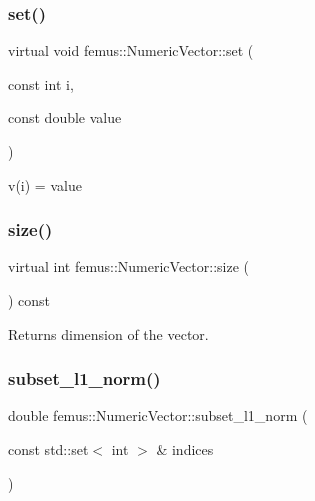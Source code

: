 \subsubsection{\texorpdfstring{set()}{set()}}
{\footnotesize\ttfamily virtual void femus\+::\+Numeric\+Vector\+::set (\begin{DoxyParamCaption}\item[{const int}]{i,  }\item[{const double}]{value }\end{DoxyParamCaption})\hspace{0.3cm}{\ttfamily [pure virtual]}}



v(i) = value 

\mbox{\label{classfemus_1_1_numeric_vector_a54137bb26362db737820d48b5c6169ed}} 
\subsubsection{\texorpdfstring{size()}{size()}}
{\footnotesize\ttfamily virtual int femus\+::\+Numeric\+Vector\+::size (\begin{DoxyParamCaption}{ }\end{DoxyParamCaption}) const\hspace{0.3cm}{\ttfamily [pure virtual]}}

\begin{DoxyReturn}{Returns}
dimension of the vector. 
\end{DoxyReturn}
\mbox{\label{classfemus_1_1_numeric_vector_a31ab593cb8e23427dfc052f722534bff}} 
\subsubsection{\texorpdfstring{subset\+\_\+l1\+\_\+norm()}{subset\_l1\_norm()}}
{\footnotesize\ttfamily double femus\+::\+Numeric\+Vector\+::subset\+\_\+l1\+\_\+norm (\begin{DoxyParamCaption}\item[{const std\+::set$<$ int $>$ \&}]{indices }\end{DoxyParamCaption})\hspace{0.3cm}{\ttfamily [virtual]}}

